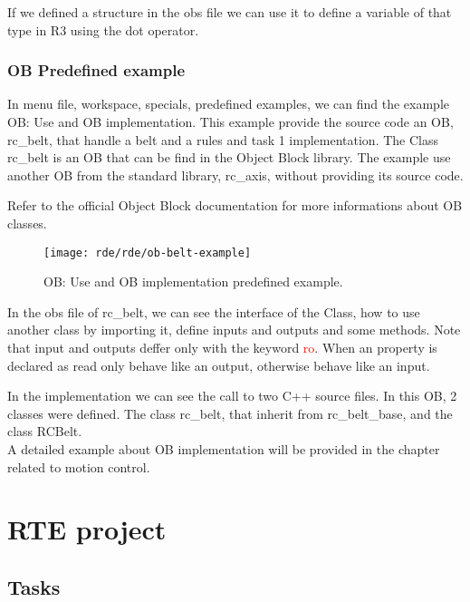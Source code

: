 If we defined a structure in the obs file we can use it to define a variable of that type in R3 using the dot operator.

%	
\subsubsection{OB Predefined example}
In menu file, workspace, specials, predefined examples, we can find the example OB: Use and OB implementation. This example provide the source code an OB, rc\_belt, that handle a belt and a rules and task 1 implementation.
The Class rc\_belt is an OB that can be find in the Object Block library. The example use another OB from the standard library, rc\_axis, without providing its source code.

Refer to the official Object Block documentation for more informations about OB classes.

\begin{figure}[h]
	\centering\texttt{[image: rde/rde/ob-belt-example]}
	\caption{OB: Use and OB implementation predefined example.}
	\label{fig:obbeltexample}
\end{figure}

In the obs file of rc\_belt, we can see the interface of the Class, how to use another class by importing it, define inputs and outputs and some methods. Note that input and outputs deffer only with the keyword \textcolor{red}{ro}. When an property is declared as read only behave like an output, otherwise behave like an input.

In the implementation we can see the call to two C++ source files. In this OB, 2 classes were defined. The class rc\_belt, that inherit from rc\_belt\_base, and the class RCBelt.\\

A detailed example about OB implementation will be provided in the chapter related to motion control.

\section{RTE project}

%	
\subsection{Tasks}

